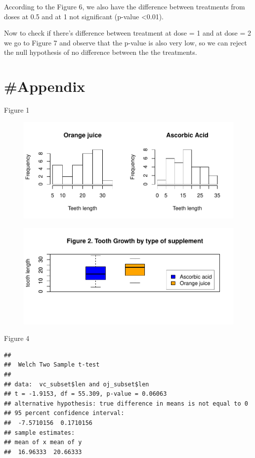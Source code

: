 \documentclass[]{article}
\begin{document}
According to the Figure 6, we also have the difference between
treatments from doses at 0.5 and at 1 not significant (p-value
\textless{}0.01).

Now to check if there's difference between treatment at dose = 1 and at
dose = 2 we go to Figure 7 and observe that the p-value is also very
low, so we can reject the null hypothesis of no difference between the
the treatments.

\newpage

\section{\#Appendix}\label{appendix}

Figure 1

\begin{figure}[htbp]
\centering
\includegraphics{inference_project_part2_files/figure-latex/unnamed-chunk-3-1.pdf}
\caption{}
\end{figure}

\begin{figure}[htbp]
\centering
\includegraphics{inference_project_part2_files/figure-latex/unnamed-chunk-4-1.pdf}
\caption{}
\end{figure}

Figure 4

\begin{verbatim}
## 
##  Welch Two Sample t-test
## 
## data:  vc_subset$len and oj_subset$len
## t = -1.9153, df = 55.309, p-value = 0.06063
## alternative hypothesis: true difference in means is not equal to 0
## 95 percent confidence interval:
##  -7.5710156  0.1710156
## sample estimates:
## mean of x mean of y 
##  16.96333  20.66333
\end{verbatim}
\end{document}
